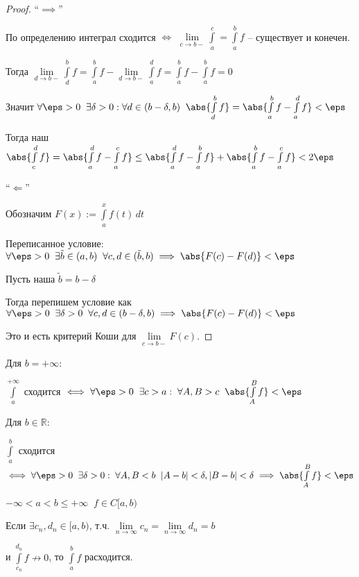 \begin{proof}\slashns
	
	``$\implies$''
	
	По определению интеграл сходится $\iff$ $\lim\limits_{c \to b-} \int\limits_a^c = \int\limits_a^b f$ -- существует и конечен.
	
	Тогда $\lim\limits_{d \to b-} \int\limits_d^b f = \int\limits_a^b f - \lim\limits_{d \to b-} \int\limits_a^d f = \int\limits_a^b f - \int\limits_a^b f = 0$
	
	Значит $\forall \eps > 0 \;\; \exists \delta > 0 : \forall d \in(b - \delta, b) \;\; \abs{\int\limits_d^b f} = \abs{\int\limits_a^b f - \int\limits_a^d f} < \eps$
	
	Тогда наш $ \abs{\int\limits_c^d f} = \abs{\int\limits_a^d f - \int\limits_a^c f} \le \abs{\int\limits_a^d f - \int\limits_a^b f} + \abs{\int\limits_a^b f - \int\limits_a^c f} < 2\eps$
	
	``$\Longleftarrow$''
	
	Обозначим $F(x) := \int\limits_a^x f(t) \, dt$
	
	Переписанное условие: $\forall \eps > 0 \;\;\exists \tilde{b} \in (a,b)\;\; \forall c, d \in (\tilde{b}, b) \implies \abs{F(c) - F(d)} < \eps$
	
	Пусть наша $\tilde{b} = b - \delta$
	
	Тогда перепишем условие как $\forall \eps > 0 \;\;\exists \delta > 0 \;\;\forall c, d \in (b- \delta, b) \implies \abs{F(c) - F(d)} < \eps$
	
	Это и есть критерий Коши для $\lim\limits_{c \to b-} F(c)$.
\end{proof}

\begin{remark}\slashns
	
	Для $ b = +\infty$:
	
	$ \int\limits_a^{+\infty}$ сходится $ \iff \forall \eps > 0 \;\; \exists c > a : \; \forall A, B > c \;\; \abs{\int\limits_A^B f} < \eps$
	
	Для $ b \in \mathbb{R}$:
	
	$ \int\limits_a^b$ сходится $ \iff \forall \eps > 0 \;\; \exists \delta > 0 : \; \forall A, B < b \;\; |A-b| < \delta, |B-b| < \delta \implies \abs{\int\limits_A^B f} < \eps $
	
\end{remark}

\begin{consequence}\slashns
	
	$-\infty < a < b \le +\infty \;\; f \in C[a,b)$
	
	Если $\exists c_n, d_n \in[a,b)$, т.ч. $\lim\limits_{n \to \infty} c_n = \lim\limits_{n \to \infty} d_n = b$
	
	и $\int\limits_{c_n}^{d_n} f \not\to 0$, то $\int\limits_a^b f$ расходится.
	
\end{consequence}

